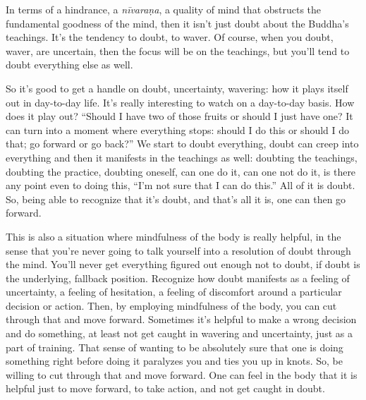 In terms of a hindrance, a \emph{nīvaraṇa}, a quality of mind that
obstructs the fundamental goodness of the mind, then it isn’t just doubt
about the Buddha’s teachings. It’s the tendency to doubt, to waver. Of
course, when you doubt, waver, are uncertain, then the focus will be on
the teachings, but you’ll tend to doubt everything else as well.

So it’s good to get a handle on doubt, uncertainty, wavering: how it
plays itself out in day-to-day life. It’s really interesting to watch on
a day-to-day basis. How does it play out? “Should I have two of those
fruits or should I just have one? It can turn into a moment where
everything stops: should I do this or should I do that; go forward or go
back?” We start to doubt everything, doubt can creep into everything and
then it manifests in the teachings as well: doubting the teachings,
doubting the practice, doubting oneself, can one do it, can one not do
it, is there any point even to doing this, “I’m not sure that I can do
this.” All of it is doubt. So, being able to recognize that it’s doubt,
and that’s all it is, one can then go forward.

This is also a situation where mindfulness of the body is really
helpful, in the sense that you’re never going to talk yourself into a
resolution of doubt through the mind. You’ll never get everything
figured out enough not to doubt, if doubt is the underlying, fallback
position. Recognize how doubt manifests as a feeling of uncertainty, a
feeling of hesitation, a feeling of discomfort around a particular
decision or action. Then, by employing mindfulness of the body, you can
cut through that and move forward. Sometimes it’s helpful to make a
wrong decision and do something, at least not get caught in wavering and
uncertainty, just as a part of training. That sense of wanting to be
absolutely sure that one is doing something right before doing it
paralyzes you and ties you up in knots. So, be willing to cut through
that and move forward. One can feel in the body that it is helpful just
to move forward, to take action, and not get caught in doubt.
